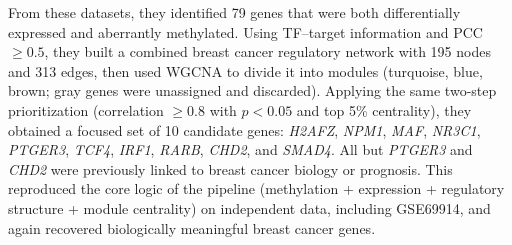 \documentclass[10pt]{extarticle}
\begin{document}
From these datasets, they identified 79 genes that were both differentially expressed and aberrantly methylated. Using TF--target information and PCC~$\geq 0.5$, they built a combined breast cancer regulatory network with 195 nodes and 313 edges, then used WGCNA to divide it into modules (turquoise, blue, brown; gray genes were unassigned and discarded). Applying the same two-step prioritization (correlation $\geq 0.8$ with $p<0.05$ and top 5\% centrality), they obtained a focused set of 10 candidate genes: \textit{H2AFZ}, \textit{NPM1}, \textit{MAF}, \textit{NR3C1}, \textit{PTGER3}, \textit{TCF4}, \textit{IRF1}, \textit{RARB}, \textit{CHD2}, and \textit{SMAD4}. All but \textit{PTGER3} and \textit{CHD2} were previously linked to breast cancer biology or prognosis. This reproduced the core logic of the pipeline (methylation + expression + regulatory structure + module centrality) on independent data, including GSE69914, and again recovered biologically meaningful breast cancer genes.
\end{document}
